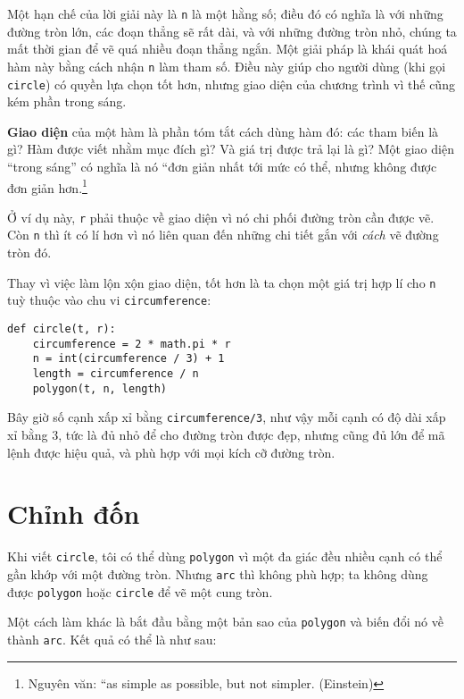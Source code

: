 \documentclass[11pt]{book}
\begin{document}
Một hạn chế của lời giải này là {\tt n} là một hằng số; điều đó có nghĩa
là với những đường tròn lớn, các đoạn thẳng sẽ rất dài, và với những
đường tròn nhỏ, chúng ta mất thời gian để vẽ quá nhiều đoạn thẳng
ngắn. Một giải pháp là khái quát hoá hàm này bằng cách nhận {\tt n}
làm tham số. Điều này giúp cho người dùng (khi gọi {\tt circle}) có
quyền lựa chọn tốt hơn, nhưng giao diện của chương trình vì thế cũng
kém phần trong sáng.


{\bf Giao diện} của một hàm là phần tóm tắt cách dùng hàm đó: các
tham biến là gì? Hàm được viết nhằm mục đích gì? Và giá trị được trả lại
là gì? Một giao diện ``trong sáng'' có nghĩa là nó ``đơn giản nhất tới mức
có thể, nhưng không được đơn giản hơn.\footnote{Nguyên văn: ``as simple as
possible, but not simpler. (Einstein)}


Ở ví dụ này, {\tt r} phải thuộc về giao diện vì nó chi phối đường tròn cần được vẽ.
Còn {\tt n} thì ít có lí hơn vì nó liên quan đến những chi tiết gắn với {\em cách}
vẽ đường tròn đó.

Thay vì việc làm lộn xộn giao diện, tốt hơn là ta chọn 
một giá trị hợp lí cho {\tt n} tuỳ thuộc vào chu vi {\tt circumference}:

\beforeverb
\begin{verbatim}
def circle(t, r):
    circumference = 2 * math.pi * r
    n = int(circumference / 3) + 1
    length = circumference / n
    polygon(t, n, length)
\end{verbatim}
\afterverb
%
Bây giờ số cạnh xấp xỉ bằng {\tt circumference/3}, như vậy mỗi 
cạnh có độ dài xấp xỉ bằng 3, tức là đủ nhỏ để cho đường tròn
được đẹp, nhưng cũng đủ lớn để mã lệnh được hiệu quả, và phù 
hợp với mọi kích cỡ đường tròn.


\section{Chỉnh đốn}
\label{refactoring}

Khi viết {\tt circle}, tôi có thể dùng {\tt polygon} vì một đa giác
đều nhiều cạnh có thể gần khớp với một đường tròn. Nhưng 
{\tt arc} thì không phù hợp; ta không dùng được {\tt polygon}
hoặc {\tt circle} để vẽ một cung tròn.

Một cách làm khác là bắt đầu bằng một bản sao của 
{\tt polygon} và biến đổi nó về thành {\tt arc}.  Kết quả có thể
là như sau:
\end{document}
